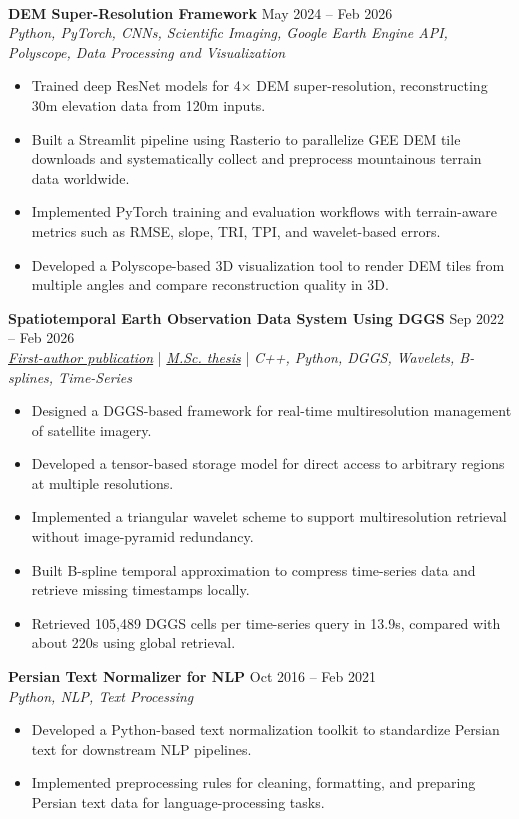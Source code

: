 \documentclass[a4paper,10pt]{article}
\begin{document}
\noindent \\
\textbf{DEM Super-Resolution Framework} \hfill May 2024 -- Feb 2026 \\
\textit{Python, PyTorch, CNNs, Scientific Imaging, Google Earth Engine API, Polyscope, Data Processing and Visualization}
\begin{itemize}[leftmargin=0.25in]
    \item Trained deep ResNet models for 4$\times$ DEM super-resolution, reconstructing 30m elevation data from 120m inputs.
    \item Built a Streamlit pipeline using Rasterio to parallelize GEE DEM tile downloads and systematically collect and preprocess mountainous terrain data worldwide.
    \item Implemented PyTorch training and evaluation workflows with terrain-aware metrics such as RMSE, slope, TRI, TPI, and wavelet-based errors.
    \item Developed a Polyscope-based 3D visualization tool to render DEM tiles from multiple angles and compare reconstruction quality in 3D.
\end{itemize}

\noindent
\textbf{Spatiotemporal Earth Observation Data System Using DGGS} \hfill Sep 2022 -- Feb 2026 \\
\textit{\href{https://doi.org/10.3390/rs17040570}{First-author publication}} | \textit{\href{https://ucalgary.scholaris.ca/items/114b394b-e516-4732-bd3a-45dd6160d480}{M.Sc. thesis}} | \textit{C++, Python, DGGS, Wavelets, B-splines, Time-Series}
\begin{itemize}[leftmargin=0.25in]
    \item Designed a DGGS-based framework for real-time multiresolution management of satellite imagery.
    \item Developed a tensor-based storage model for direct access to arbitrary regions at multiple resolutions.
    \item Implemented a triangular wavelet scheme to support multiresolution retrieval without image-pyramid redundancy.
    \item Built B-spline temporal approximation to compress time-series data and retrieve missing timestamps locally.
    \item Retrieved 105,489 DGGS cells per time-series query in 13.9s, compared with about 220s using global retrieval.
\end{itemize}

\noindent
\textbf{Persian Text Normalizer for NLP} \hfill Oct 2016 -- Feb 2021 \\
\textit{Python, NLP, Text Processing}
\begin{itemize}[leftmargin=0.25in]
    \item Developed a Python-based text normalization toolkit to standardize Persian text for downstream NLP pipelines.
    \item Implemented preprocessing rules for cleaning, formatting, and preparing Persian text data for language-processing tasks.
\end{itemize}
\end{document}
